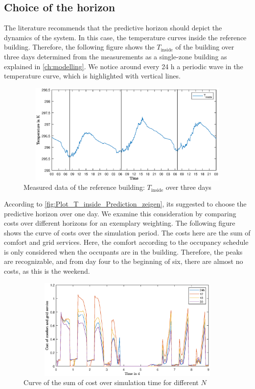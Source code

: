 \subsection{Choice of the horizon}
\label{subsec:ChoiceHorizon}
The literature recommends that the predictive horizon should depict the dynamics of the system. In this case, the temperature curves inside the reference building. Therefore, the following figure shows the $T_\text{inside}$ of the building over three days determined from the measurements as a single-zone building as explained in \autoref{ch:modelling}. We notice around every 24 h a periodic wave in the temperature curve, which is highlighted with vertical lines.\newline
    \begin{figure}[H]
            \centering
            \includegraphics[width=15cm,height=5cm]{figure/Plot_T_inside_Prediction_zeigen.eps}
           \caption{Measured data of the reference building: $T_\text{inside}$ over three days}
            \label{fig:Plot_T_inside_Prediction_zeigen}
    \end{figure}
According to \autoref{fig:Plot_T_inside_Prediction_zeigen}, its suggested to choose the predictive horizon over one day. We examine this consideration by comparing costs over different horizons for an exemplary weighting. The following figure shows the curve of costs over the simulation period. The costs here are the sum of comfort and grid services. Here, the comfort according to the occupancy schedule is only considered when the occupants are in the building. Therefore, the peaks are recognizable, and from day four to the beginning of six, there are almost no costs, as this is the weekend.
    \begin{figure}[h]
            \centering
            \includegraphics[width=15cm,height=5cm]{figure/Gesamtkosten_Vergleich_horizonte.eps}
           \caption{Curve of the sum of cost over simulation time for different $N$}
            \label{fig:Gesamtkosten_Vergleich_horizonte}
    \end{figure}
